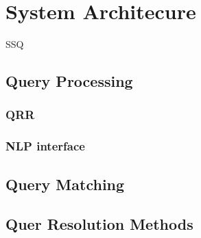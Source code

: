 \section{System Architecure}

SSQ %

\subsection{Query Processing}


  \subsubsection{QRR} %

  \subsubsection{NLP interface} %


\subsection{Query Matching}

  
\subsection{Quer Resolution Methods} 

